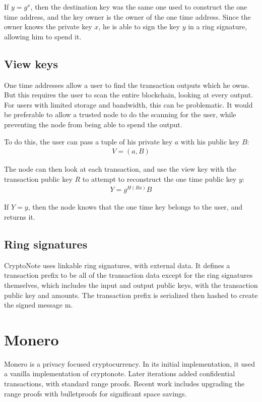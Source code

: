 \documentclass{article}
\begin{document}
If $y = g^x$, then the destination key was the same one used to construct the one time address, and the key owner is the owner of the one time address.  Since the owner knows the private key $x$, he is able to sign the key $y$ in a ring signature, allowing him to spend it.


\subsection{View keys}

One time addresses allow a user to find the transaction outputs which he owns.  But this requires the user to scan the entire blockchain, looking at every output.  For users with limited storage and bandwidth, this can be problematic.  It would be preferable to allow a trusted node to do the scanning for the user, while preventing the node from being able to spend the output.

To do this, the user can pass a tuple of his private key $a$ with his public key $B$:
\begin{align}
  V = (a, B)
\end{align}

The node can then look at each transaction, and use the view key with the transaction public key $R$ to attempt to reconstruct the one time public key $y$:
\begin{align}
  Y = g^{H(Ra)} B
\end{align}

If $Y = y$, then the node knows that the one time key belongs to the user, and returns it.


\subsection{Ring signatures}

CryptoNote uses linkable ring signatures, with external data.  It defines a transaction prefix to be all of the transaction data except for the ring signatures themselves, which includes the input and output public keys, with the transaction public key and amounts.  The transaction prefix is serialized then hashed to create the signed message m.



\section{Monero}

Monero is a privacy focused cryptocurrency.  In its initial implementation, it used a vanilla implementation of cryptonote.  Later iterations added confidential transactions, with standard range proofs.  Recent work includes upgrading the range proofs with bulletproofs for significant space savings.
\end{document}
